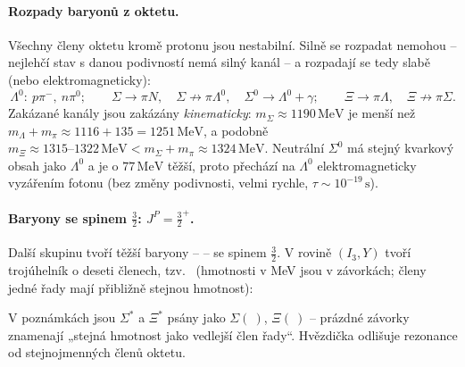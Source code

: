 \paragraph{Rozpady baryonů z oktetu.}
Všechny členy oktetu kromě protonu jsou nestabilní. Silně se rozpadat
nemohou -- nejlehčí stav s danou podivností nemá silný kanál -- a rozpadají
se tedy slabě (nebo elektromagneticky):
\[
  \Lambda^0:\ p\pi^-,\ n\pi^0; \qquad
  \Sigma\to\pi N,\quad \Sigma\not\to\pi\Lambda^0,\quad
  \Sigma^0\to\Lambda^0+\gamma; \qquad
  \Xi\to\pi\Lambda,\quad \Xi\not\to\pi\Sigma .
\]
Zakázané kanály jsou zakázány \emph{kinematicky}: \(m_\Sigma\approx
1190\,\mathrm{MeV}\) je menší než \(m_\Lambda+m_\pi\approx1116+135=
1251\,\mathrm{MeV}\), a podobně \(m_\Xi\approx1315\text{--}1322\,\mathrm{MeV}
< m_\Sigma+m_\pi\approx1324\,\mathrm{MeV}\). Neutrální \(\Sigma^0\) má
stejný kvarkový obsah jako \(\Lambda^0\) a je o \(77\,\mathrm{MeV}\) těžší,
proto přechází na \(\Lambda^0\) elektromagneticky vyzářením fotonu (bez
změny podivnosti, velmi rychle, \(\tau\sim10^{-19}\,\mathrm{s}\)).

\paragraph{Baryony se spinem \(\tfrac32\): \(J^P=\tfrac32^+\).}
Další skupinu tvoří těžší baryony --  -- se spinem
\(\tfrac32\). V rovině \((I_3,Y)\) tvoří trojúhelník o deseti členech, tzv.\
 (hmotnosti v MeV jsou v závorkách; členy jedné řady mají
přibližně stejnou hmotnost):
\begin{center}
\end{center}
V poznámkách jsou \(\Sigma^*\) a \(\Xi^*\) psány jako \(\Sigma(\ )\),
\(\Xi(\ )\) -- prázdné závorky znamenají „stejná hmotnost jako vedlejší člen
řady“. Hvězdička odlišuje rezonance od stejnojmenných členů oktetu.

